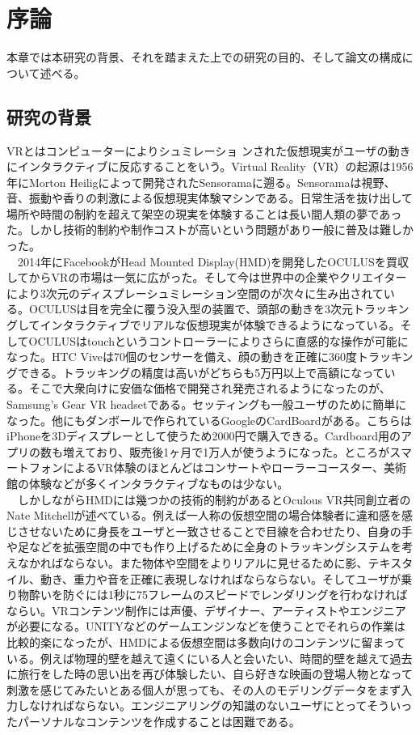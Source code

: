 \chapter{序論}
\label{chap:introduction}

本章では本研究の背景、それを踏まえた上での研究の目的、そして論文の構成について述べる。

\section{研究の背景}
VRとはコンピューターによりシュミレーショ ンされた仮想現実がユーザの動きにインタラクティブに反応することをいう。Virtual Reality（VR）の起源は1956年にMorton Heiligによって開発されたSensoramaに遡る。Sensoramaは視野、音、振動や香りの刺激による仮想現実体験マシンである\cite{sensorama}。日常生活を抜け出して場所や時間の制約を超えて架空の現実を体験することは長い間人類の夢であった\cite{verge}。しかし技術的制約や制作コストが高いという問題があり一般に普及は難しかった。\\
　2014年にFacebookがHead Mounted Display(HMD)を開発したOCULUSを買収してからVRの市場は一気に広がった\cite{vrtrendShiny}。そして今は世界中の企業やクリエイターにより3次元のディスプレーシュミレーション空間のが次々に生み出されている\cite{vrtrendSamuel}。OCULUSは目を完全に覆う没入型の装置で、頭部の動きを3次元トラッキングしてインタラクティブでリアルな仮想現実が体験できるようになっている。そしてOCULUSはtouchというコントローラーによりさらに直感的な操作が可能になった\cite{touch}。HTC Viveは70個のセンサーを備え、顔の動きを正確に360度トラッキングできる\cite{vive}。トラッキングの精度は高いがどちらも5万円以上で高額になっている。そこで大衆向けに安価な価格で開発され発売されるようになったのが、Samsung's Gear VR headsetである\cite{samsung}。セッティングも一般ユーザのために簡単になった。他にもダンボールで作られているGoogleのCardBoardがある。こちらはiPhoneを3Dディスプレーとして使うため2000円で購入できる。Cardboard用のアプリの数も増えており、販売後1ヶ月で1万人が使うようになった\cite{cardboard}。ところがスマートフォンによるVR体験のほとんどはコンサートやローラーコースター、美術館の体験などが多くインタラクティブなものは少ない。\\
　しかしながらHMDには幾つかの技術的制約があるとOculous VR共同創立者のNate Mitchellが述べている\cite{oculus}。例えば一人称の仮想空間の場合体験者に違和感を感じさせないために身長をユーザと一致させることで目線を合わせたり、自身の手や足などを拡張空間の中でも作り上げるために全身のトラッキングシステムを考えなかればならない。また物体や空間をよりリアルに見せるために影、テキスタイル、動き、重力や音を正確に表現しなければならならない\cite{vrtrendShiny}。そしてユーザが乗り物酔いを防ぐには1秒に75フレームのスピードでレンダリングを行わなければならい\cite{HMDifficulties}。VRコンテンツ制作には声優、デザイナー、アーティストやエンジニアが必要になる。UNITYなどのゲームエンジンなどを使うことでそれらの作業は比較的楽になったが、HMDによる仮想空間は多数向けのコンテンツに留まっている。例えば物理的壁を越えて遠くにいる人と会いたい、時間的壁を越えて過去に旅行をした時の思い出を再び体験したい、自ら好きな映画の登場人物となって刺激を感じてみたいとある個人が思っても、その人のモデリングデータをまず入力しなければならない。エンジニアリングの知識のないユーザにとってそういったパーソナルなコンテンツを作成することは困難である。\\
